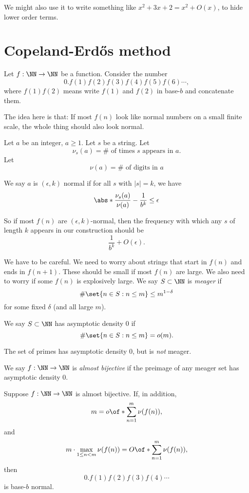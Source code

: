 \documentclass{article}
\begin{document}
We might also use it to write something like 
$x^2+3x+2 = x^2 + O(x)$, to hide lower order terms.

\section{Copeland-Erd\H{o}s method}

Let $f : \NN\to \NN$ be a function.
Consider the number 
\[0.f(1)f(2)f(3)f(4)f(5)f(6)\cdots, \]
where $f(1)f(2)$ means write $f(1)$ and $f(2)$
in base-$b$ and concatenate them.

The idea here is that: If most $f(n)$ look like 
normal numbers on a small finite scale, the whole
thing should also look normal.

\begin{definition}
Let $a$ be an integer, $a\ge 1$. Let $s$ be a string.
Let \[ \nu_s(a)=\#\text{ of times $s$ appears in $a$}.\]
Let \[\nu(a) = \#\text{ of digits in $a$}\]

We say $a$ is $(\epsilon,k)$ normal if 
for all $s$ with $|s|=k$, we have 
\[\abs*{\frac{\nu_s(a)}{\nu(a)} -\frac{1}{b^k}} 
\le \epsilon\]
\end{definition}

So if most $f(n)$ are $(\epsilon,k)$-normal, then
the frequency with which any $s$ of length $k$
appears in our construction should be 
\[\frac{1}{b^k} + O(\epsilon). \]

We have to be careful. We need to worry about strings 
that start in $f(n)$ and ends in $f(n+1)$.
These should be small if most $f(n)$ are large.
We also need to worry if some $f(n)$ is explosively
large. 
We say $S\subset \NN$ is \emph{meager} if 
\[\#\set{n\in S:n\le m} \le m^{1-\delta} \]
for some fixed $\delta$ (and all large $m$).

We say $S\subset \NN$ has asymptotic density $0$ if
\[ \#\set{n\in S: n\le m} = o(m).\]

\begin{note}
    The set of primes has asymptotic density $0$, 
    but is \emph{not} meager.
\end{note}

\begin{definition}
We say $f:\NN\to \NN$ is \emph{almost bijective}
if the preimage of any meager set has 
asymptotic density $0$. 
\end{definition}

\begin{theorem}
    Suppose $f:\NN\to\NN$ is almost bijective.
    If, in addition, 
    \[ m = o\of*{\sum_{n=1}^m \nu(f(n)) },\]
    and 
    \[ m\cdot \max_{1\le n < m} \nu(f(n)) = 
    O\of*{\sum_{n=1}^m \nu(f(n))},\]
    then 
    \[0.f(1)f(2)f(3)f(4)\cdots \]
    is base-$b$ normal.
\end{theorem}
\end{document}
